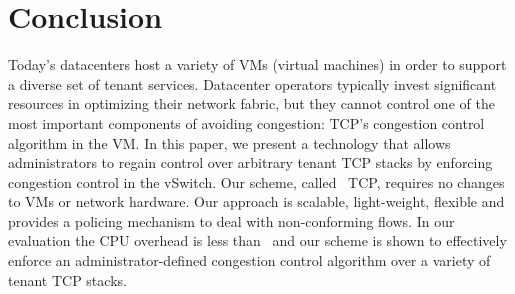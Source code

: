 \section{Conclusion}
Today's datacenters host a variety of VMs (virtual machines) in order to
support a diverse set of tenant services. Datacenter operators
typically invest significant resources in optimizing their network fabric,
but they cannot control one of the most important components of 
avoiding congestion: TCP's congestion control algorithm in the VM. In this paper,
we present a technology that allows administrators to regain control over arbitrary tenant TCP stacks by enforcing congestion
control in the vSwitch. Our scheme, called~\acdc{} TCP, requires no 
changes to VMs or network hardware. Our approach is scalable, light-weight,
flexible and provides a policing mechanism to deal with non-conforming flows.
In our evaluation the CPU overhead is less than~ and our scheme 
is shown to effectively enforce an administrator-defined congestion control
algorithm over a variety of tenant TCP stacks.


